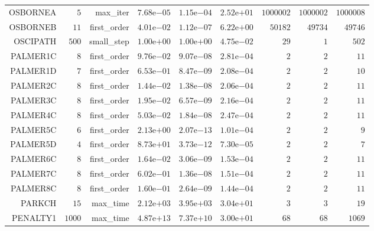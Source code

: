 \begin{longtable}{rrrrrrrrr}
OSBORNEA & \(     5\) & max\_iter & \( 7.68\)e\(-05\) & \( 1.15\)e\(-04\) & \( 2.52\)e\(+01\) & \(1000002\) & \(1000002\) & \(1000008\) \\
OSBORNEB & \(    11\) & first\_order & \( 4.01\)e\(-02\) & \( 1.12\)e\(-07\) & \( 6.22\)e\(+00\) & \( 50182\) & \( 49734\) & \( 49746\) \\
OSCIPATH & \(   500\) & small\_step & \( 1.00\)e\(+00\) & \( 1.00\)e\(+00\) & \( 4.75\)e\(-02\) & \(    29\) & \(     1\) & \(   502\) \\
PALMER1C & \(     8\) & first\_order & \( 9.76\)e\(-02\) & \( 9.07\)e\(-08\) & \( 2.81\)e\(-04\) & \(     2\) & \(     2\) & \(    11\) \\
PALMER1D & \(     7\) & first\_order & \( 6.53\)e\(-01\) & \( 8.47\)e\(-09\) & \( 2.08\)e\(-04\) & \(     2\) & \(     2\) & \(    10\) \\
PALMER2C & \(     8\) & first\_order & \( 1.44\)e\(-02\) & \( 1.38\)e\(-08\) & \( 2.06\)e\(-04\) & \(     2\) & \(     2\) & \(    11\) \\
PALMER3C & \(     8\) & first\_order & \( 1.95\)e\(-02\) & \( 6.57\)e\(-09\) & \( 2.16\)e\(-04\) & \(     2\) & \(     2\) & \(    11\) \\
PALMER4C & \(     8\) & first\_order & \( 5.03\)e\(-02\) & \( 1.84\)e\(-08\) & \( 2.47\)e\(-04\) & \(     2\) & \(     2\) & \(    11\) \\
PALMER5C & \(     6\) & first\_order & \( 2.13\)e\(+00\) & \( 2.07\)e\(-13\) & \( 1.01\)e\(-04\) & \(     2\) & \(     2\) & \(     9\) \\
PALMER5D & \(     4\) & first\_order & \( 8.73\)e\(+01\) & \( 3.73\)e\(-12\) & \( 7.30\)e\(-05\) & \(     2\) & \(     2\) & \(     7\) \\
PALMER6C & \(     8\) & first\_order & \( 1.64\)e\(-02\) & \( 3.06\)e\(-09\) & \( 1.53\)e\(-04\) & \(     2\) & \(     2\) & \(    11\) \\
PALMER7C & \(     8\) & first\_order & \( 6.02\)e\(-01\) & \( 1.36\)e\(-08\) & \( 1.51\)e\(-04\) & \(     2\) & \(     2\) & \(    11\) \\
PALMER8C & \(     8\) & first\_order & \( 1.60\)e\(-01\) & \( 2.64\)e\(-09\) & \( 1.44\)e\(-04\) & \(     2\) & \(     2\) & \(    11\) \\
PARKCH & \(    15\) & max\_time & \( 2.12\)e\(+03\) & \( 3.95\)e\(+03\) & \( 3.04\)e\(+01\) & \(     3\) & \(     3\) & \(    19\) \\
PENALTY1 & \(  1000\) & max\_time & \( 4.87\)e\(+13\) & \( 7.37\)e\(+10\) & \( 3.00\)e\(+01\) & \(    68\) & \(    68\) & \(  1069\) \\

\end{longtable}
